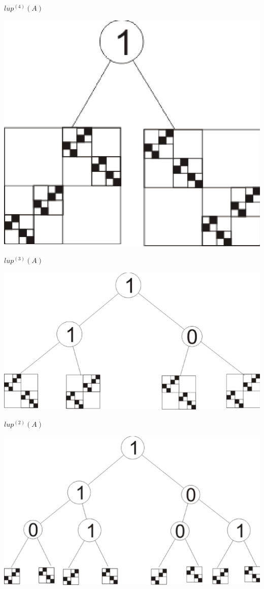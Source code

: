 \documentclass[a4paper,12pt]{article} \usepackage{a4wide}
\numberwithin{equation}{subsection}
\begin{document}
 $lup^{(4)}(A)$
\begin{center}
\includegraphics[scale=0.6]{m2plup1.eps}
\end{center}
$lup^{(3)}(A)$
\begin{center}
\includegraphics[scale=0.4]{m2plup2.eps}
\end{center}
$lup^{(2)}(A)$
\begin{center}
\includegraphics[scale=0.4]{m2plup3.eps}
\end{center}
\end{document}
